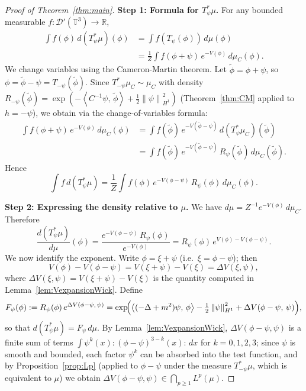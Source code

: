 \documentclass[12pt]{article}
\newcommand{\T}{\mathbb{T}}
\newcommand{\R}{\mathbb{R}}
\newcommand{\Dc}{\mathcal{D}}
\newcommand{\norm}[1]{\left\|#1\right\|}
\newcommand{\ip}[2]{\left\langle #1,\, #2 \right\rangle}
\newcommand{\wick}[1]{:\!#1\!:}
\begin{document}
\begin{proof}[Proof of Theorem~\ref{thm:main}]

\textbf{Step 1: Formula for $T_\psi^*\mu$.}
For any bounded measurable $f:\Dc'(\T^3)\to\R$,
\begin{align*}
  \int f(\phi)\,d(T_\psi^*\mu)(\phi)
  &= \int f(T_\psi(\phi))\,d\mu(\phi)\\
  &= \frac{1}{Z}\int f(\phi+\psi)\,e^{-V(\phi)}\,d\mu_C(\phi).
\end{align*}
We change variables using the Cameron-Martin theorem.  Let $\tilde{\phi}=\phi+\psi$, so
$\phi = \tilde{\phi}-\psi = T_{-\psi}(\tilde\phi)$.  Since $T_{-\psi}^*\mu_C \sim \mu_C$
with density $R_{-\psi}(\tilde\phi) = \exp(-\ip{C^{-1}\psi}{\tilde\phi}+\tfrac{1}{2}\norm\psi_{H^1}^2)$
(Theorem~\ref{thm:CM} applied to $h=-\psi$), we obtain via the change-of-variables formula:
\begin{align*}
  \int f(\phi+\psi)\,e^{-V(\phi)}\,d\mu_C(\phi)
  &= \int f(\tilde\phi)\,e^{-V(\tilde\phi-\psi)}\,d(T_\psi^*\mu_C)(\tilde\phi)\\
  &= \int f(\tilde\phi)\,e^{-V(\tilde\phi-\psi)}\,R_\psi(\tilde\phi)\,d\mu_C(\tilde\phi).
\end{align*}
Hence
\[
  \int f\,d(T_\psi^*\mu) = \frac{1}{Z}\int f(\phi)\,e^{-V(\phi-\psi)}\,R_\psi(\phi)\,d\mu_C(\phi).
\]

\textbf{Step 2: Expressing the density relative to $\mu$.}
We have $d\mu = Z^{-1}e^{-V(\phi)}\,d\mu_C$.  Therefore
\[
  \frac{d(T_\psi^*\mu)}{d\mu}(\phi)
  = \frac{e^{-V(\phi-\psi)}\,R_\psi(\phi)}{e^{-V(\phi)}}
  = R_\psi(\phi)\,e^{V(\phi)-V(\phi-\psi)}.
\]
We now identify the exponent.  Write $\phi = \xi + \psi$ (i.e.\ $\xi = \phi - \psi$); then
\[
  V(\phi) - V(\phi-\psi) = V(\xi+\psi) - V(\xi) = \Delta V(\xi, \psi),
\]
where $\Delta V(\xi,\psi) = V(\xi+\psi)-V(\xi)$ is the quantity computed in
Lemma~\ref{lem:VexpansionWick}.  Define
\begin{equation}\label{eq:RNfull2}
  F_\psi(\phi) := R_\psi(\phi)\,e^{\Delta V(\phi-\psi,\,\psi)}
  = \exp\!\Bigl(
      \ip{(-\Delta+m^2)\psi}{\phi} - \tfrac{1}{2}\norm{\psi}_{H^1}^2
      + \Delta V(\phi-\psi,\,\psi)
    \Bigr),
\end{equation}
so that $d(T_\psi^*\mu) = F_\psi\,d\mu$.  By Lemma~\ref{lem:VexpansionWick},
$\Delta V(\phi-\psi,\psi)$ is a finite sum of terms $\int\psi^k(x)\wick{(\phi-\psi)^{3-k}(x)}\,dx$
for $k=0,1,2,3$; since $\psi$ is smooth and bounded, each factor $\psi^k$ can be absorbed
into the test function, and by Proposition~\ref{prop:Lp} (applied to $\phi-\psi$ under the
measure $T_{-\psi}^*\mu$, which is equivalent to $\mu$) we obtain
$\Delta V(\phi-\psi,\psi)\in\bigcap_{p\ge 1}L^p(\mu)$.


\end{proof}
\end{document}
